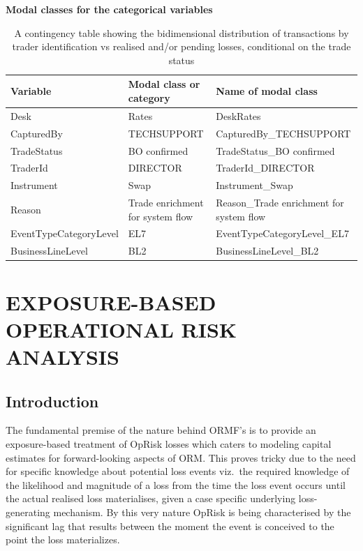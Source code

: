 \documentclass{DissertateUSU}
\begin{document}
\begin{table}[htbp]
        \centering
        \textbf{Modal classes for the categorical variables} 
\singlespacing        
        \small
        \setlength\tabcolsep{2pt}
            \begin{tabular}{|l|l|p{4cm}|} \hline
            Variable & Modal class or category & Name of modal class \\\hline
            Desk & Rates & DeskRates \\ \cline{1-3}
            CapturedBy & TECHSUPPORT & CapturedBy\_TECHSUPPORT \\ \cline{1-3}
            TradeStatus & BO confirmed & TradeStatus\_BO confirmed \\ \cline{1-3}
            TraderId & DIRECTOR & TraderId\_DIRECTOR \\ \cline{1-3}
            Instrument & Swap & Instrument\_Swap \\ \cline{1-3}
            Reason & Trade enrichment for system flow  & Reason\_Trade enrichment for system flow \\ \cline{1-3}
            EventTypeCategoryLevel & EL7 & EventTypeCategoryLevel\_EL7 \\ \cline{1-3}
            BusinessLineLevel & BL2 & BusinessLineLevel\_BL2 \\ \cline{1-3} 
            \end{tabular}
            \caption{A contingency table showing the bidimensional distribution of transactions by trader identification vs realised and/or pending losses, conditional on the trade status}
            \label{tab:Mosaic_Contingency}
\end{table}
\doublespacing

\singlespacing

\FloatBarrier
\newpage
{}
\fancyhead[R]{\thepage}
\fancyfoot[C]{}

\chapter{EXPOSURE-BASED OPERATIONAL RISK ANALYSIS}
\label{EXPOSURE-BASED OPERATIONAL RISK ANALYSIS}

\doublespacing

\section{Introduction}
\label{sec3:Introduction}

The fundamental premise of the nature behind ORMF's is to provide an
exposure-based treatment of OpRisk losses which caters to modeling
capital estimates for forward-looking aspects of ORM. This proves tricky
due to the need for specific knowledge about potential loss events
viz.~the required knowledge of the likelihood and magnitude of a loss
from the time the loss event occurs until the actual realised loss
materialises, given a case specific underlying loss-generating
mechanism. By this very nature OpRisk is being characterised by the
significant lag that results between the moment the event is conceived
to the point the loss materializes.\medskip 
\end{document}

